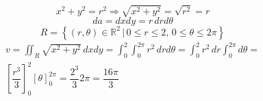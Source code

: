 \begin{enumerate}
	
	\begin{equation*}
		x^2 + y^2 = r^2 \Rightarrow \sqrt{x^2 + y^2} = \sqrt{r^2} = r
	\end{equation*}
	\begin{equation*}
		da = dx dy = r\, dr d\theta
	\end{equation*}
	\begin{equation*}
		R = \left\{(r, \theta) \in \mathbb{R}^2 \,|\, 0 \leq r \leq 2,\, 0 \leq \theta \leq 2\pi\right\}
	\end{equation*}
	\begin{align*}
		v = \iint_R \sqrt{x^2 + y^2}\, dxdy = \int_0^2 \int_0^{2\pi} r^2\, drd\theta = \int_0^2 r^2\, dr \int_0^{2\pi} d\theta =\\ \left[\dfrac{r^3}{3}\right]_0^2 [\theta]_0^{2\pi} = \dfrac{2^3}{3}2\pi = \dfrac{16\pi}{3}
	\end{align*}
\end{enumerate}